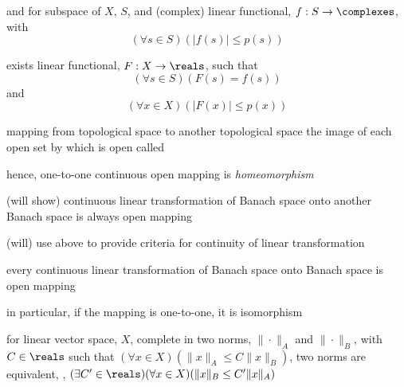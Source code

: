 \documentclass[17pt,landscape]{foils}
\begin{document}
{{		and for subspace of $X$, $S$, and (complex) linear functional, $f:S\to\complexes$, with
		\[
		(
			\forall s \in S
		)
		(
			|f(s)| \leq p(s)
		)
\]

		exists linear functional, $F:X\to\reals$, such that
		\[
		(
			\forall s \in S
		)
		(
			F(s) = f(s)
		)
\]
		and
		\[
		(
			\forall x \in X
		)
		(
			|F(x)| \leq p(x)
		)
\]
\eit



\bit
	\item mapping from topological space to another topological space
		the image of each open set by which is open
		called 

	\vitem hence, one-to-one continuous open mapping is \emph{homeomorphism}

	\vitem (will show)
		continuous linear transformation of Banach space onto another Banach space
		is
		always open mapping

	\vitem (will)
		use above to provide criteria
		for continuity of linear transformation
\eit



\bit
\iffalse
	\item for every continuous linear transformation, $A$, of Banach space, $X$, onto Banach space, $Y$
%
		\[
			(
				\exists \epsilon > 0
			)
			(
				\forall x \in X
			)
			(
				\|x\|\leq 1 \Rightarrow \|Ax\|\geq \epsilon
			)
		\]
%
		\bit
			\vitem \ie, image of unit sphere about origin in $X$ contains \emph{a} sphere about origin in $Y$
		\eit

	\vitem
\fi
	\item every continuous linear transformation of Banach space onto Banach space is open mapping
	\bit
		\item in particular, if the mapping is one-to-one, it is isomorphism%
	\eit

	\vitem for linear vector space, $X$, complete in two norms, $\|\cdot\|_A$ and $\|\cdot\|_B$,
		with $C\in\reals$ such that
		$
			(\forall x\in X)(\|x\|_A \leq C \|x\|_B)
		$,
		two norms are equivalent, \ie,
		$
			(\exists C'\in\reals)(\forall x\in X)(\|x\|_B \leq C' \|x\|_A)
		$

}}
\end{document}
